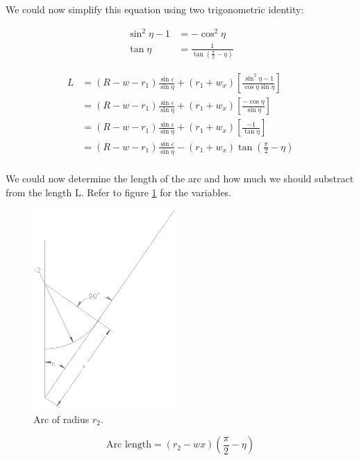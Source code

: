 \documentclass[11pt, titlepage]{article}
\begin{document}
  We could now simplify this equation using two trigonometric
  identity:

\begin{align*}
  \sin^2{\eta} -1 &= -\cos^2{\eta}\\
       \tan{\eta} &= \frac{1}{\tan{(\frac{\pi}{2}-\eta)}}
\end{align*}

\begin{equation}
\begin{split}
  L &= (R-w-r_1)\frac{\sin{\varepsilon}}{\sin{\eta}} + 
             (r_1+w_x)\left[
             \frac{\sin^2{\eta}-1}{\cos{\eta}\sin{\eta}} \right]\\
      &= (R-w-r_1)\frac{\sin{\varepsilon}}{\sin{\eta}} + 
             (r_1+w_x)\left[ \frac{-\cos{\eta}}{\sin{\eta}} \right]\\
      &= (R-w-r_1)\frac{\sin{\varepsilon}}{\sin{\eta}} + 
             (r_1+w_x)\left[ \frac{-1}{\tan{\eta}} \right]\\
      &= (R-w-r_1)\frac{\sin{\varepsilon}}{\sin{\eta}} - 
             (r_1+w_x)\tan{(\frac{\pi}{2}-\eta)}\\
\end{split}
\end{equation}


 We could now determine the length of the arc and how much we should
 substract from the length L. Refer to figure \ref{arc} for the
 variables.

 \begin{figure}
 \begin{center}
 \includegraphics[height=3in]{img/arc.ps}
      \caption{Arc of radius $r_2$.}\label{arc}
 \end{center}
\end{figure}

  $$\text{Arc length} = (r_2-wx)(\frac{\pi}{2}-\eta)$$
\end{document}
